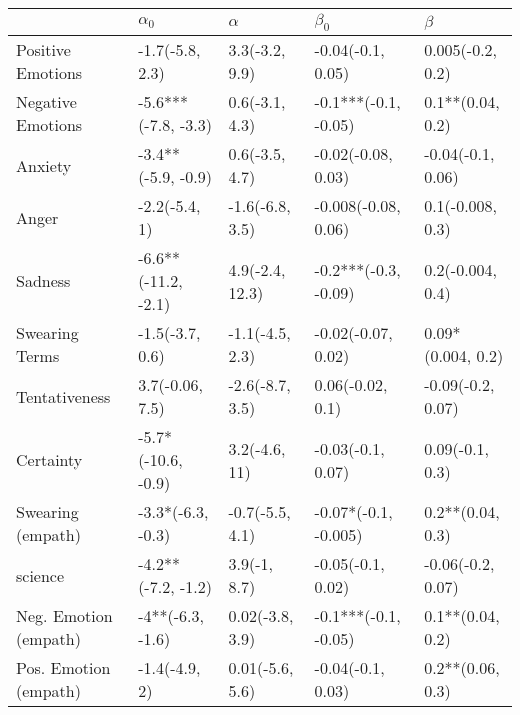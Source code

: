 \begin{tabular}{lllll}
\toprule
{} &           $\alpha_0$ &         $\alpha$ &             $\beta_0$ &            $\beta$ \\
\midrule
Positive Emotions     &      -1.7(-5.8, 2.3) &   3.3(-3.2, 9.9) &     -0.04(-0.1, 0.05) &   0.005(-0.2, 0.2) \\
Negative Emotions     &  -5.6***(-7.8, -3.3) &   0.6(-3.1, 4.3) &  -0.1***(-0.1, -0.05) &   0.1**(0.04, 0.2) \\
Anxiety               &   -3.4**(-5.9, -0.9) &   0.6(-3.5, 4.7) &    -0.02(-0.08, 0.03) &  -0.04(-0.1, 0.06) \\
Anger                 &        -2.2(-5.4, 1) &  -1.6(-6.8, 3.5) &   -0.008(-0.08, 0.06) &   0.1(-0.008, 0.3) \\
Sadness               &  -6.6**(-11.2, -2.1) &  4.9(-2.4, 12.3) &  -0.2***(-0.3, -0.09) &   0.2(-0.004, 0.4) \\
Swearing Terms        &      -1.5(-3.7, 0.6) &  -1.1(-4.5, 2.3) &    -0.02(-0.07, 0.02) &  0.09*(0.004, 0.2) \\
Tentativeness         &      3.7(-0.06, 7.5) &  -2.6(-8.7, 3.5) &      0.06(-0.02, 0.1) &  -0.09(-0.2, 0.07) \\
Certainty             &   -5.7*(-10.6, -0.9) &    3.2(-4.6, 11) &     -0.03(-0.1, 0.07) &    0.09(-0.1, 0.3) \\
Swearing (empath)     &    -3.3*(-6.3, -0.3) &  -0.7(-5.5, 4.1) &  -0.07*(-0.1, -0.005) &   0.2**(0.04, 0.3) \\
science               &   -4.2**(-7.2, -1.2) &     3.9(-1, 8.7) &     -0.05(-0.1, 0.02) &  -0.06(-0.2, 0.07) \\
Neg. Emotion (empath) &     -4**(-6.3, -1.6) &  0.02(-3.8, 3.9) &  -0.1***(-0.1, -0.05) &   0.1**(0.04, 0.2) \\
Pos. Emotion (empath) &        -1.4(-4.9, 2) &  0.01(-5.6, 5.6) &     -0.04(-0.1, 0.03) &   0.2**(0.06, 0.3) \\
\bottomrule
\end{tabular}
